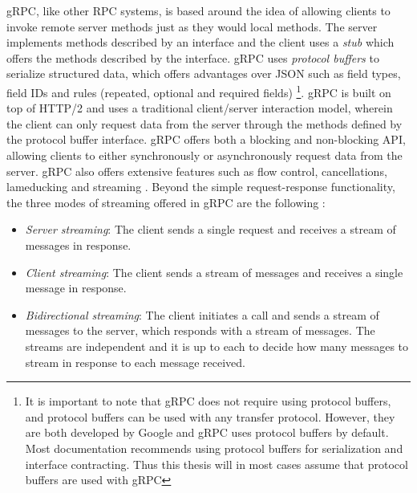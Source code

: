 gRPC, like other RPC systems, is based around the idea of allowing clients to invoke remote server methods just as they would local methods. The server implements methods described by an interface and the client uses a \textit{stub} which offers the methods described by the interface. gRPC uses \textit{protocol buffers} to serialize structured data, which offers advantages over JSON such as field types, field IDs and rules (repeated, optional and required fields) \footnote{It is important to note that gRPC does not require using protocol buffers, and protocol buffers can be used with any transfer protocol. However, they are both developed by Google and gRPC uses protocol buffers by default. Most documentation recommends using protocol buffers for serialization and interface contracting. Thus this thesis will in most cases assume that protocol buffers are used with gRPC}. 
gRPC is built on top of HTTP/2 and uses a traditional client/server interaction model, wherein the client can only request data from the server through the methods defined by the protocol buffer interface. gRPC offers both a blocking and non-blocking API, allowing clients to either synchronously or asynchronously request data from the server. gRPC also offers extensive features such as flow control, cancellations, lameducking and streaming \cite{ryan2015motivation}. Beyond the simple request-response functionality, the three modes of streaming offered in gRPC are the following \cite{grpccore}:
\begin{itemize}
    \item \textit{Server streaming}: The client sends a single request and receives a stream of messages in response.
    \item \textit{Client streaming}: The client sends a stream of messages and receives a single message in response.
    \item \textit{Bidirectional streaming}: The client initiates a call and sends a stream of messages to the server, which responds with a stream of messages. The streams are independent and it is up to each to decide how many messages to stream in response to each message received.
\end{itemize}



